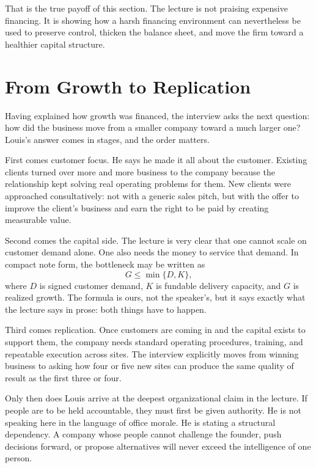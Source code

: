 That is the true payoff of this section. The lecture is not praising expensive financing. It is showing how a harsh financing environment can nevertheless be used to preserve control, thicken the balance sheet, and move the firm toward a healthier capital structure.

\section{From Growth to Replication}

Having explained how growth was financed, the interview asks the next question: how did the business move from a smaller company toward a much larger one? Louis's answer comes in stages, and the order matters.

First comes customer focus. He says he made it all about the customer. Existing clients turned over more and more business to the company because the relationship kept solving real operating problems for them. New clients were approached consultatively: not with a generic sales pitch, but with the offer to improve the client's business and earn the right to be paid by creating measurable value.

Second comes the capital side. The lecture is very clear that one cannot scale on customer demand alone. One also needs the money to service that demand. In compact note form, the bottleneck may be written as
\begin{equation}
G \le \min\{D,K\},
\end{equation}
where \(D\) is signed customer demand, \(K\) is fundable delivery capacity, and \(G\) is realized growth. The formula is ours, not the speaker's, but it says exactly what the lecture says in prose: both things have to happen.

Third comes replication. Once customers are coming in and the capital exists to support them, the company needs standard operating procedures, training, and repeatable execution across sites. The interview explicitly moves from winning business to asking how four or five new sites can produce the same quality of result as the first three or four.

Only then does Louis arrive at the deepest organizational claim in the lecture. If people are to be held accountable, they must first be given authority. He is not speaking here in the language of office morale. He is stating a structural dependency. A company whose people cannot challenge the founder, push decisions forward, or propose alternatives will never exceed the intelligence of one person.

